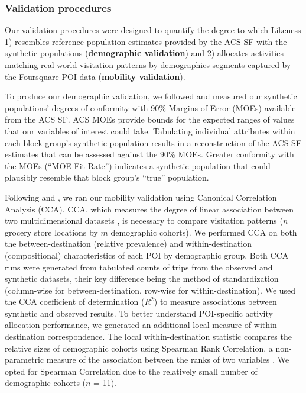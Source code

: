 \subsubsection{Validation procedures}

Our validation procedures were designed to quantify the degree to which Likeness 1) resembles reference population estimates provided by the ACS SF with the synthetic populations (\textbf{demographic validation}) and 2) allocates activities matching real-world visitation patterns by demographics segments captured by the Foursquare POI data (\textbf{mobility validation}).

To produce our demographic validation, we followed \cite{urbanpop-AG-2023} and measured our synthetic populations' degrees of conformity with 90\% Margins of Error (MOEs) available from the ACS SF. ACS MOEs provide bounds for the expected ranges of values that our variables of interest could take. Tabulating individual attributes within each block group's synthetic population results in a reconstruction of the ACS SF estimates that can be assessed against the 90\% MOEs. Greater conformity with the MOEs (``MOE Fit Rate'') indicates a synthetic population that could plausibly resemble that block group's ``true'' population.

Following \cite{urbanpop-AG-2023} and \cite{likeness-scipy-paper-2022}, we ran our mobility validation using Canonical Correlation Analysis (CCA). CCA, which measures the degree of linear association between two multidimensional datasets \cite{hardoon2004canonical}, is necessary to compare visitation patterns ($n$ grocery store locations by $m$ demographic cohorts). We performed CCA on both the between-destination (relative prevalence) and within-destination (compositional) characteristics of each POI by demographic group. Both CCA runs were generated from tabulated counts of trips from the observed and synthetic datasets, their key difference being the method of standardization (column-wise for between-destination, row-wise for within-destination). We used the CCA coefficient of determination ($R^2$) to measure associations between synthetic and observed results. To better understand POI-specific activity allocation performance, we generated an additional local measure of within-destination correspondence. The local within-destination statistic compares the relative sizes of demographic cohorts using Spearman Rank Correlation, a non-parametric measure of the association between the ranks of two variables \cite{zar1972significance}. We opted for Spearman Correlation due to the relatively small number of demographic cohorts ($n$ = 11).

